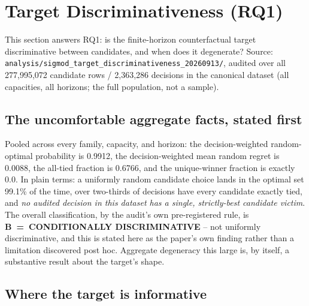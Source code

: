 \section{Target Discriminativeness (RQ1)}
\label{sec:characterization}

This section answers RQ1: is the finite-horizon counterfactual target
discriminative between candidates, and when does it degenerate? Source:
\texttt{analysis/sigmod\_target\_discriminativeness\_20260913/}, audited
over all 277,995,072 candidate rows / 2,363,286 decisions in the canonical
dataset (all capacities, all horizons; the full population, not a sample).

\subsection{The uncomfortable aggregate facts, stated first}

Pooled across every family, capacity, and horizon: the decision-weighted
random-optimal probability is 0.9912, the decision-weighted mean random
regret is 0.0088, the all-tied fraction is 0.6766, and the unique-winner
fraction is exactly 0.0. In plain terms: a uniformly random candidate
choice lands in the optimal set 99.1\% of the time, over two-thirds of
decisions have every candidate exactly tied, and \emph{no audited decision
in this dataset has a single, strictly-best candidate victim}. The overall
classification, by the audit's own pre-registered rule, is
\textbf{B~=~CONDITIONALLY DISCRIMINATIVE} -- not uniformly discriminative,
and this is stated here as the paper's own finding rather than a limitation
discovered post hoc. Aggregate degeneracy this large is, by itself, a
substantive result about the target's shape.

\subsection{Where the target is informative}

